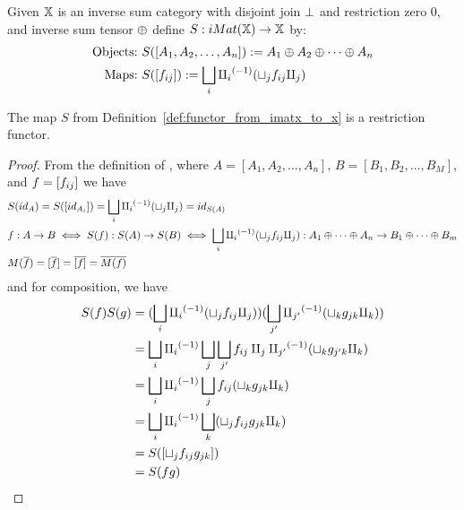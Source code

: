 \begin{definition}\label{def:functor_from_imatx_to_x}
  Given $\mathbb{X}$ is an inverse sum category with disjoint join $\perp$ and restriction zero $0$,
  and inverse sum tensor $\oplus$ define $S:iMat({\mathbb{X}}) \to \mathbb{X}$ by:
  \begin{align*}
    \text{Objects:}\ &S([A_1,A_2, \ldots, A_n]) := A_1\oplus A_2\oplus\cdots\oplus A_n\\
    \text{Maps:}\ &S([f_{ij}]) := \bigsqcup_i {\amalg_{i}}^{(-1)} (\sqcup_j f_{ij} \amalg_{j})
  \end{align*}
\end{definition}

\begin{lemma}\label{lem:s_is_a_functor}
  The map $S$ from Definition~\ref{def:functor_from_imatx_to_x} is a restriction functor.
\end{lemma}
\begin{proof}
  From the definition of \imatx, where $A = [A_1,A_2,\ldots,A_n]$, $B=[B_1,B_2,\ldots,B_M]$,
  and $f = [f_{ij}]$ we have
  \begin{align*}
    &S(id_A)  = S([id_{A_i}]) = \bigsqcup_i {\amalg_{i}}^{(-1)} (\sqcup_j \amalg_{j}) = id_{S(A)}\\
    &f: A\to B  \iff S(f):S(A)\to S(B) \iff
      \bigsqcup_i {\amalg_{i}}^{(-1)} (\sqcup_j f_{ij} \amalg_{j}) : A_1\oplus\cdots\oplus A_n \to B_1\oplus\cdots\oplus B_m\\
    &M(\overline{f}) = [\overline{f}] = \overline{[f]} = \overline{M(f)}
  \end{align*}
  and for composition, we have
  \begin{align*}
    S(f)S(g) & = (\bigsqcup_i {\amalg_{i}}^{(-1)} (\sqcup_j f_{ij} \amalg_{j}))
                  (\bigsqcup_{j'} {\amalg_{j'}}^{(-1)} (\sqcup_k g_{jk} \amalg_{k})) \\
    &= \bigsqcup_i {\amalg_{i}}^{(-1)} \bigsqcup_j \bigsqcup_{j'} f_{ij} \amalg_{j} {\amalg_{j'}}^{(-1)}
            (\sqcup_k g_{j'k} \amalg_{k}) \\
    &= \bigsqcup_i {\amalg_{i}}^{(-1)} \bigsqcup_j  f_{ij} (\sqcup_k g_{jk} \amalg_{k}) \\
    &= \bigsqcup_i {\amalg_{i}}^{(-1)} \bigsqcup_k (\sqcup_j  f_{ij}  g_{jk} \amalg_{k}) \\
    &= S([\sqcup_j f_{ij} g_{jk}]) \\
    &= S(f g)
  \end{align*}

\end{proof}

